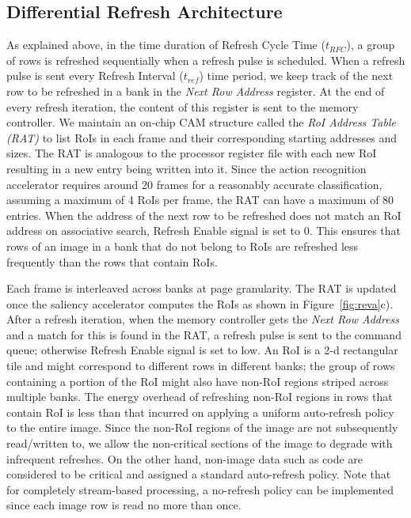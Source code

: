 \subsection{Differential Refresh Architecture}
As explained above, in the time duration of Refresh Cycle Time ($t_{RFC}$), a group of rows is refreshed sequentially when a refresh pulse is scheduled. When a refresh pulse is sent every Refresh Interval ($t_{ref}$) time period, we keep track of the next row to be refreshed in a bank in the \emph{Next Row Address} register. At the end of every refresh iteration, the content of this register is sent to the memory controller. 
We maintain an on-chip CAM structure called the \emph{RoI Address Table (RAT)} to list RoIs in each frame and their corresponding starting addresses and sizes. The RAT is analogous to the processor register file with each new RoI resulting in a new entry being written into it. 
Since the action recognition accelerator requires around 20 frames for a reasonably accurate classification, assuming a maximum of 4 RoIs per frame, the RAT can have a maximum of 80 entries. When the address of the next row to be refreshed does not match an RoI address on associative search, Refresh Enable signal is set to 0. This ensures that rows of an image in a bank that do not belong to RoIs are refreshed less frequently than the rows that contain RoIs. 

Each frame is interleaved across banks at page granularity. The RAT is updated once the saliency accelerator computes the RoIs as shown in Figure~\ref{fig:reva}c). After a refresh iteration, when the memory controller gets the \emph{Next Row Address} and a match for this is found in the RAT, a refresh pulse is sent to the command queue; otherwise Refresh Enable signal is set to low. An RoI is a 2-d rectangular tile and might correspond to different rows in different banks; the group of rows containing a portion of the RoI might also have non-RoI regions striped across multiple banks. The energy overhead of refreshing non-RoI regions in rows that contain RoI is less than that incurred on applying a uniform auto-refresh policy to the entire image. Since the non-RoI regions of the image are not subsequently read/written to, we allow the non-critical sections of the image to degrade with infrequent refreshes. On the other hand, non-image data such as code are considered to be critical and assigned a standard auto-refresh policy. Note that for completely stream-based processing, a no-refresh policy can be implemented since each image row is read no more than once.
 
